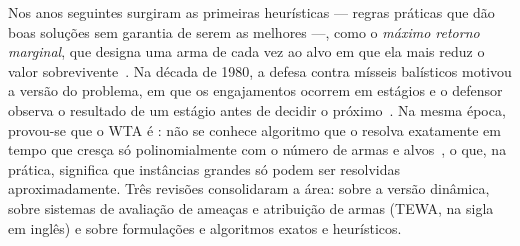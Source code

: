 Nos anos seguintes surgiram as primeiras heurísticas --- regras práticas que dão boas soluções sem garantia de serem as
melhores ---, como o \emph{máximo retorno marginal}, que designa uma arma de cada vez ao alvo em que ela mais reduz o
valor sobrevivente~\cite{denbroeder1959}. Na década de 1980, a defesa contra mísseis balísticos motivou a versão
 do problema, em que os engajamentos ocorrem em estágios e o defensor observa o resultado de um
estágio antes de decidir o próximo~\cite{hosein1990}. Na mesma época, provou-se que o WTA é : não
se conhece algoritmo que o resolva exatamente em tempo que cresça só polinomialmente com o número de armas e
alvos~\cite{lloyd1986}, o que, na prática, significa que instâncias grandes só podem ser resolvidas aproximadamente.
Três revisões consolidaram a área: \citet{cai2006} sobre a versão dinâmica, \citet{roux2007} sobre sistemas de avaliação
de ameaças e atribuição de armas (TEWA, na sigla em inglês) e \citet{kline2019} sobre formulações e algoritmos exatos e
heurísticos.

